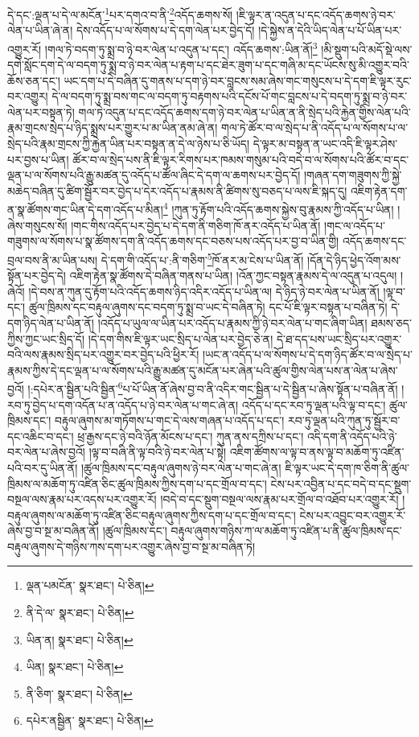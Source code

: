དེ་དང་:ལྡན་པ་དེ་ལ་མངོན་\footnote{ལྡན་པམངོན་  སྣར་ཐང་།  པེ་ཅིན། }པར་དགའ་བ་ནི་\footnote{ནི་དེ་ལ་  སྣར་ཐང་།  པེ་ཅིན། }འདོད་ཆགས་སོ། །ཇི་ལྟར་ན་འདུན་པ་དང་འདོད་ཆགས་ཉེ་བར་ལེན་པ་ཡིན་ཞེ་ན། དེས་འདོད་པ་ལ་སོགས་པ་དེ་དག་ལེན་པར་བྱེད་དོ། །དེ་སྐྱེས་ན་དེའི་ཡིད་ལེན་པ་པོ་ཡིན་པར་འགྱུར་རོ། །གལ་ཏེ་བདག་ཏུ་སྨྲ་བ་ཉེ་བར་ལེན་པ་འདུན་པ་དང་། འདོད་ཆགས་:ཡིན་ནོ།\footnote{ཡིན་ན།  སྣར་ཐང་།  པེ་ཅིན། } །མི་སྡུག་པའི་མདོ་སྡེ་ལས་དགེ་སློང་དག་དེ་ལ་བདག་ཏུ་སྨྲ་བ་ཉེ་བར་ལེན་པ་རྟག་པ་དང་ཐེར་ཟུག་པ་དང་གཞི་མ་དང་ཡོངས་སུ་མི་འགྱུར་བའི་ཆོས་ཅན་དང་། ཡང་དག་པ་དེ་བཞིན་དུ་གནས་པ་དག་ཉེ་བར་བླངས་སམ་ཞེས་གང་གསུངས་པ་དེ་དག་ཇི་ལྟར་རུང་བར་འགྱུར། དེ་ལ་བདག་ཏུ་སྨྲ་བས་གང་ལ་བདག་ཏུ་བརྟགས་པའི་དངོས་པོ་གང་བླངས་པ་དེ་བདག་ཏུ་སྨྲ་བ་ཉེ་བར་ལེན་པར་བསྟན་ཏེ། གལ་ཏེ་འདུན་པ་དང་འདོད་ཆགས་དག་ཉེ་བར་ལེན་པ་ཡིན་ན་ནི་སྲེད་པའི་རྐྱེན་གྱིས་ལེན་པའི་རྣམ་གྲངས་སྲེད་པ་ཉིད་སྨྲས་པར་གྱུར་པ་མ་ཡིན་ནམ་ཞེ་ན། གལ་ཏེ་ཚོར་བ་ལ་སྲེད་པ་ནི་འདོད་པ་ལ་སོགས་པ་ལ་སྲེད་པའི་རྣམ་གྲངས་ཀྱི་རྐྱེན་ཡིན་པར་བསྟན་ན་དེ་ལ་ཉེས་པ་ཅི་ཡོད། དེ་ལྟར་མ་བསྟན་ན་ཡང་འདི་ཇི་ལྟར་ཤེས་པར་བྱས་པ་ཡིན། ཚོར་བ་ལ་སྲེད་པས་ནི་ཇི་ལྟར་རིགས་པར་ཁམས་གསུམ་པའི་བདེ་བ་ལ་སོགས་པའི་ཚོར་བ་དང་ལྡན་པ་ལ་སོགས་པའི་རྒྱུ་མཚན་དུ་འདོད་པ་ཚོལ་ཞིང་དེ་དག་ལ་ཆགས་པར་བྱེད་དོ། །གཞན་དག་གཟུགས་ཀྱི་སྐྱེ་མཆེད་བཞིན་དུ་ཚིག་སྦྱོར་བར་བྱེད་པ་དེར་འདོད་པ་རྣམས་ནི་ཚིགས་སུ་བཅད་པ་ལས་ཇི་སྐད་དུ། འཇིག་རྟེན་དག་ན་སྣ་ཚོགས་གང་ཡིན་དེ་དག་འདོད་པ་མིན།\footnote{ཡིན།  སྣར་ཐང་།  པེ་ཅིན། } །ཀུན་ཏུ་རྟོག་པའི་འདོད་ཆགས་སྐྱེས་བུ་རྣམས་ཀྱི་འདོད་པ་ཡིན། །ཞེས་གསུངས་སོ། །གང་གིས་འདོད་པར་བྱེད་པ་དེ་དག་ནི་གཅིག་ཁོ་ནར་འདོད་པ་ཡིན་ནོ། །གང་ལ་འདོད་པ་གཟུགས་ལ་སོགས་པ་སྣ་ཚོགས་དག་ནི་འདོད་ཆགས་དང་བཅས་པས་འདོད་པར་བྱ་བ་ཡིན་གྱི། འདོད་ཆགས་དང་བྲལ་བས་ནི་མ་ཡིན་པས། དེ་དག་གི་འདོད་པ་:ནི་གཅིག་\footnote{ནི་ཅིག་  སྣར་ཐང་།  པེ་ཅིན། }ཁོ་ནར་མ་ངེས་པ་ཡིན་ནོ། །དོན་དེ་ཉིད་ཕྱེད་འོག་མས་སྟོན་པར་བྱེད་དེ། འཇིག་རྟེན་སྣ་ཚོགས་དེ་བཞིན་གནས་པ་ཡིན། །འོན་ཀྱང་བསྟན་རྣམས་དེ་ལ་འདུན་པ་འདུལ། །ཞེའོ། །དེ་བས་ན་ཀུན་དུ་རྟོག་པའི་འདོད་ཆགས་ཉིད་འདིར་འདོད་པ་ཡིན་ལ། དེ་ཉིད་ཉེ་བར་ལེན་པ་ཡིན་ནོ། །ལྟ་བ་དང་། ཚུལ་ཁྲིམས་དང་བརྟུལ་ཞུགས་དང་བདག་ཏུ་སྨྲ་བ་ཡང་དེ་བཞིན་ཏེ། དང་པོ་ཇི་ལྟར་བསྟན་པ་བཞིན་ཏེ། དེ་དག་ཉིད་ལེན་པ་ཡིན་ནོ། །འདོད་པ་ཡུལ་ལ་ཡིན་པར་འདོད་པ་རྣམས་ཀྱི་ཉེ་བར་ལེན་པ་གང་ཞིག་ཡིན། ཐམས་ཅད་ཀྱིས་ཀྱང་ཡང་སྲིད་དོ། །དེ་དག་གིས་ཇི་ལྟར་ཡང་སྲིད་པ་ལེན་པར་བྱེད་ཅེ་ན། དེ་ཐ་དད་པས་ཡང་སྲིད་པར་འགྱུར་བའི་ལས་རྣམས་སྲིད་པར་འགྱུར་བར་བྱེད་པའི་ཕྱིར་རོ། །ཡང་ན་འདོད་པ་ལ་སོགས་པ་དེ་དག་ཉིད་ཚོར་བ་ལ་སྲེད་པ་རྣམས་ཀྱིས་དེ་དང་ལྡན་པ་ལ་སོགས་པའི་རྒྱུ་མཚན་དུ་མངོན་པར་ཞེན་པའི་ཚུལ་གྱིས་ལེན་པས་ན་ལེན་པ་ཞེས་བྱའོ། །:དཔེར་ན་སྦྱིན་པའི་སྦྱིན་\footnote{དཔེར་ནསྦྱིན་  སྣར་ཐང་།  པེ་ཅིན། }པ་པོ་ཡིན་ནོ་ཞེས་བྱ་བ་ནི་འདིར་གང་སྦྱིན་པ་དེ་སྦྱིན་པ་ཞེས་སྟོན་པ་བཞིན་ནོ། །རབ་ཏུ་བྱེད་པ་དག་འདོན་པ་ན་འདོད་པ་ཉེ་བར་ལེན་པ་གང་ཞེ་ན། འདོད་པ་དང་རབ་ཏུ་ལྡན་པའི་ལྟ་བ་དང་། ཚུལ་ཁྲིམས་དང་། བརྟུལ་ཞུགས་མ་གཏོགས་པ་གང་དེ་ལས་གཞན་པ་འདོད་པ་དང་། རབ་ཏུ་ལྡན་པའི་ཀུན་ཏུ་སྦྱོར་བ་དང་འཆིང་བ་དང་། ཕྲ་རྒྱས་དང་ཉེ་བའི་ཉོན་མོངས་པ་དང་། ཀུན་ནས་དཀྲིས་པ་དང་། འདི་དག་ནི་འདོད་པའི་ཉེ་བར་ལེན་པ་ཞེས་བྱའོ། །ལྟ་བ་བཞི་ནི་ལྟ་བའི་ཉེ་བར་ལེན་པ་སྟེ། འཇིག་ཚོགས་ལ་ལྟ་བ་ནས་ལྟ་བ་མཆོག་ཏུ་འཛིན་པའི་བར་དུ་ཡིན་ནོ། །ཚུལ་ཁྲིམས་དང་བརྟུལ་ཞུགས་ཉེ་བར་ལེན་པ་གང་ཞེ་ན། ཇི་ལྟར་ཡང་དེ་དག་ཁ་ཅིག་ནི་ཚུལ་ཁྲིམས་ལ་མཆོག་ཏུ་འཛིན་ཅིང་ཚུལ་ཁྲིམས་ཀྱིས་དག་པ་དང་གྲོལ་བ་དང་། ངེས་པར་འབྱིན་པ་དང་བདེ་བ་དང་སྡུག་བསྔལ་ལས་རྣམ་པར་འདས་པར་འགྱུར་རོ། །བདེ་བ་དང་སྡུག་བསྔལ་ལས་རྣམ་པར་གྲོལ་བ་འཐོབ་པར་འགྱུར་རོ། །བརྟུལ་ཞུགས་ལ་མཆོག་ཏུ་འཛིན་ཅིང་བརྟུལ་ཞུགས་ཀྱིས་དག་པ་དང་གྲོལ་བ་དང་། ངེས་པར་འབྱུང་བར་འགྱུར་རོ་ཞེས་བྱ་བ་སྔ་མ་བཞིན་ནོ། །ཚུལ་ཁྲིམས་དང་། བརྟུལ་ཞུགས་གཉིས་ཀ་ལ་མཆོག་ཏུ་འཛིན་པ་ནི་ཚུལ་ཁྲིམས་དང་བརྟུལ་ཞུགས་དེ་གཉིས་ཀས་དག་པར་འགྱུར་ཞེས་བྱ་བ་སྔ་མ་བཞིན་ཏེ། 
